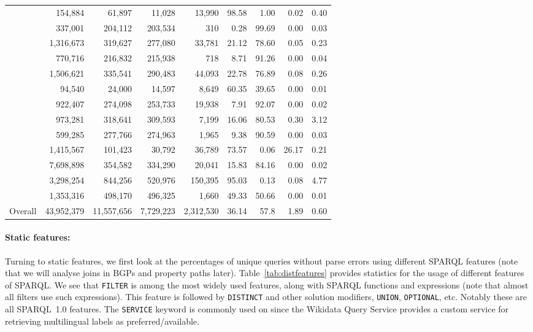 \begin{table}
\begin{tabular}{lrrrrrrrr}
\linkedgeodata	&	154,884	&	61,897	&	11,028	&	13,990	&	98.58	&	1.00	&	0.02	&	0.40	\\
\linkedspl	&	337,001	&	204,112	&	203,534	&	310	&	0.28	&	99.69	&	0.00	&	0.03	\\
\mgi	&	1,316,673	&	319,627	&	277,080	&	33,781	&	21.12	&	78.60	&	0.05	&	0.23	\\
\ncbigene	&	770,716	&	216,832	&	215,938	&	718	&	8.71	&	91.26	&	0.00	&	0.04	\\
\omim	&	1,506,621	&	335,541	&	290,483	&	44,093	&	22.78	&	76.89	&	0.08	&	0.26	\\
\pharmgkb	&	94,540	&	24,000	&	14,597	&	8,649	&	60.35	&	39.65	&	0.00	&	0.01	\\
\sabiork	&	922,407	&	274,098	&	253,733	&	19,938	&	7.91	&	92.07	&	0.00	&	0.02	\\
\sgd	&	973,281	&	318,641	&	309,593	&	7,199	&	16.06	&	80.53	&	0.30	&	3.12	\\
\sider	&	599,285	&	277,766	&	274,963	&	1,965	&	9.38	&	90.59	&	0.00	&	0.03	\\
\swdf	&	1,415,567	&	101,423	&	30,792	&	36,789	&	73.57	&	0.06	&	26.17	&	0.21	\\
\taxonomy	&	7,698,898	&	354,582	&	334,290	&	20,041	&	15.83	&	84.16	&	0.00	&	0.02	\\
\wikidata	&	3,298,254	&	844,256	&	520,976	&	150,395	&	95.03	&	0.13	&	0.08	&	4.77	\\
\wormbase	&	1,353,316	&	498,170	&	496,325	&	1,660	&	49.33	&	50.66	&	0.00	&	0.01	\\
\midrule
Overall	&	43,952,379	&	11,557,656
		&	7,729,223	&	2,312,530	&	36.14	&	57.8	&	1.89	&	0.60	\\
\bottomrule
\end{tabular}
\end{table}


\paragraph{Static features:} Turning to static features, we first look at the percentages of unique queries without parse errors using different SPARQL features (note that we will analyse joins in BGPs and property paths later). Table~\ref{tab:distfeatures} provides statistics for the usage of different features of SPARQL. We see that \texttt{FILTER} is among the most widely used features, along with SPARQL functions and expressions (note that almost all filters use such expressions). This feature is followed by \texttt{DISTINCT} and other solution modifiers, \texttt{UNION}, \texttt{OPTIONAL}, etc. Notably these are all SPARQL~1.0 features. The \texttt{SERVICE} keyword is commonly used on \wikidata since the Wikidata Query Service provides a custom service for retrieving multilingual labels as preferred/available.


